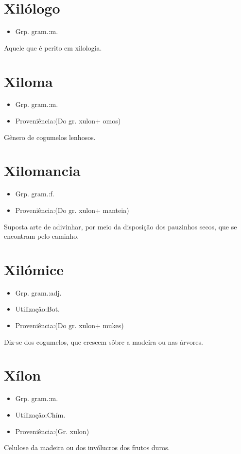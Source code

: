 \section{Xilólogo}
\begin{itemize}
\item {Grp. gram.:m.}
\end{itemize}
Aquele que é perito em xilologia.
\section{Xiloma}
\begin{itemize}
\item {Grp. gram.:m.}
\end{itemize}
\begin{itemize}
\item {Proveniência:(Do gr. \textunderscore xulon\textunderscore  + \textunderscore omos\textunderscore )}
\end{itemize}
Gênero de cogumelos lenhosos.
\section{Xilomancia}
\begin{itemize}
\item {Grp. gram.:f.}
\end{itemize}
\begin{itemize}
\item {Proveniência:(Do gr. \textunderscore xulon\textunderscore  + \textunderscore manteia\textunderscore )}
\end{itemize}
Suposta arte de adivinhar, por meio da disposição dos pauzinhos secos, que se encontram pelo caminho.
\section{Xilómice}
\begin{itemize}
\item {Grp. gram.:adj.}
\end{itemize}
\begin{itemize}
\item {Utilização:Bot.}
\end{itemize}
\begin{itemize}
\item {Proveniência:(Do gr. \textunderscore xulon\textunderscore  + \textunderscore mukes\textunderscore )}
\end{itemize}
Diz-se dos cogumelos, que crescem sôbre a madeira ou nas árvores.
\section{Xílon}
\begin{itemize}
\item {Grp. gram.:m.}
\end{itemize}
\begin{itemize}
\item {Utilização:Chím.}
\end{itemize}
\begin{itemize}
\item {Proveniência:(Gr. \textunderscore xulon\textunderscore )}
\end{itemize}
Celulose da madeira ou dos invólucros dos frutos duros.
